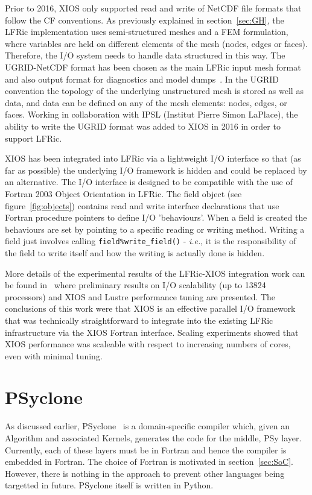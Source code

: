 \documentclass[review,times]{elsarticle}
\begin{document}
Prior to 2016, XIOS only supported read and write of NetCDF file formats that follow the CF
conventions.  As previously explained in section~\ref{sec:GH}, the LFRic implementation uses
semi-structured meshes and a FEM formulation, where variables are held on
different elements of the mesh (nodes, edges or faces). Therefore, the I/O system needs to
handle data structured in this way. The UGRID-NetCDF format has been chosen as the main
LFRic input mesh format and also output format for diagnostics and model dumps~\cite{UgridSpec}.
In the UGRID convention the topology of the underlying unstructured mesh is stored as well as
data, and data can be defined on any of the mesh elements: nodes, edges, or faces.
Working in collaboration with IPSL (Institut Pierre Simon LaPlace), the ability to write the
UGRID format was added to XIOS in 2016 in order to support LFRic. 

XIOS has been integrated into LFRic via a lightweight I/O interface so
that (as far as possible) the underlying I/O framework is hidden and
could be replaced by an alternative.  The I/O interface is designed to
be compatible with the use of Fortran 2003 Object Orientation in
LFRic. The field object (see figure~\ref{fig:objects}) contains read and write
interface declarations that use Fortran procedure pointers to define
I/O 'behaviours'. When a field is created the behaviours are set by
pointing to a specific reading or writing method. Writing a field just
involves calling \verb+field%write_field()+ - {\em i.e.}, it is the
responsibility of the field to write itself and how the writing is
actually done is hidden.

More details of the experimental results of the LFRic-XIOS integration work can be
found in~\cite{Adams2018} where preliminary results on I/O scalability (up to 13824 
processors) and XIOS and Lustre performance tuning are presented. The conclusions of
this work were that XIOS is an effective parallel I/O framework that was technically
straightforward to integrate into the existing LFRic infrastructure via the XIOS
Fortran interface. Scaling experiments showed that XIOS performance was scaleable with
respect to increasing numbers of cores, even with minimal tuning.

\section{\label{sec:psyclone}PSyclone}

As discussed earlier, PSyclone~\cite{psyclone} is a domain-specific
compiler which, given an Algorithm and associated Kernels, generates
the code for the middle, PSy layer. Currently, each of these layers
must be in Fortran and hence the compiler is embedded in
Fortran. The choice of Fortran is motivated in section~\ref{sec:SoC}. However, there is
nothing in the approach to prevent other languages being targetted in
future. PSyclone itself is written in Python.
\end{document}
